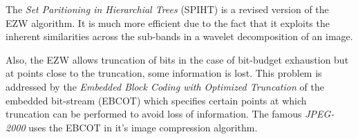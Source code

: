 \documentclass[./A14_Report.tex]{subfiles}
\begin{document}
The \textit{Set Paritioning in Hierarchial Trees} (SPIHT) is a revised version
of the EZW algorithm. It is much more efficient due to the fact that it
exploits the inherent similarities across the sub-bands in a wavelet
decomposition of an image. \cite{sayood_datac}

\par

Also, the EZW allows truncation of bits in the case of bit-budget exhaustion
but at points close to the truncation, some information is lost. This problem
is addressed by the \textit{Embedded Block Coding with Optimized Truncation} of
the embedded bit-stream (EBCOT) which specifies certain points at which
truncation can be performed to avoid loss of information. The famous
\textit{JPEG-2000} uses the EBCOT in it's image compression algorithm. \cite{sayood_datac}
\end{document}
